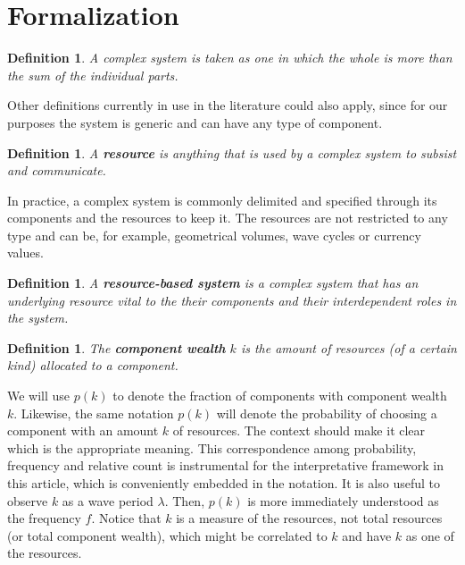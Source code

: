 \documentclass[a4paper, 11pt]{article} %
\newtheorem{definition2}[theorem3]{Definition}
\begin{document}
\section{Formalization}\label{sec:form}

\begin{definition2}
A complex system is taken as one in which the whole is more
than the sum of the individual parts.
\end{definition2}

Other definitions currently in use in the literature could also apply, since for our purposes the system is generic and can have any type of component.


\begin{definition2}
	A {\bf resource} is anything that is used by a complex system to subsist and communicate.
\end{definition2}

In practice, a complex system is commonly delimited and specified through its components and the resources to keep it. The resources are not restricted to any type and can be, for example, geometrical volumes,
wave cycles or currency values.

\begin{definition2}
	A {\bf resource-based system} is a complex system that has an underlying resource vital to the their components and their interdependent roles in the system.
\end{definition2}


\begin{definition2}
	The {\bf component wealth} $k$ is the amount of resources (of a certain kind) allocated to a component.
\end{definition2}

We will use $p(k)$ to denote the fraction of components with component wealth $k$.
Likewise, the same notation $p(k)$ will denote the probability of choosing a component with an amount $k$ of resources.
The context should make it clear which is the appropriate meaning.
This correspondence among probability, frequency and relative count is
instrumental for the interpretative framework in this article,
which is conveniently embedded in the notation.
It is also useful to observe $k$ as a wave period $\lambda$.
Then, $p(k)$ is more immediately understood as 
the frequency $f$.
Notice that $k$ is a measure of the resources,
not total resources (or total component wealth), which
might be correlated to $k$ and have $k$ as one of the resources.
\end{document}
